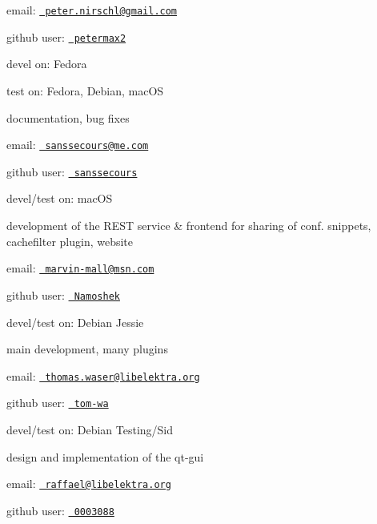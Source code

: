 \begin{DoxyItemize}
\item email\+: \href{mailto:peter.nirschl@gmail.com}{\texttt{ peter.\+nirschl@gmail.\+com}}
\item github user\+: \href{http://github.com/petermax2}{\texttt{ petermax2}}
\item devel on\+: Fedora
\item test on\+: Fedora, Debian, mac\+OS
\end{DoxyItemize}

documentation, bug fixes


\begin{DoxyItemize}
\item email\+: \href{mailto:sanssecours@me.com}{\texttt{ sanssecours@me.\+com}}
\item github user\+: \href{http://github.com/sanssecours}{\texttt{ sanssecours}}
\item devel/test on\+: mac\+OS
\end{DoxyItemize}

development of the R\+E\+ST service \& frontend for sharing of conf. snippets, cachefilter plugin, website


\begin{DoxyItemize}
\item email\+: \href{mailto:marvin-mall@msn.com}{\texttt{ marvin-\/mall@msn.\+com}}
\item github user\+: \href{https://github.com/Namoshek}{\texttt{ Namoshek}}
\item devel/test on\+: Debian Jessie
\end{DoxyItemize}

main development, many plugins


\begin{DoxyItemize}
\item email\+: \href{mailto:thomas.waser@libelektra.org}{\texttt{ thomas.\+waser@libelektra.\+org}}
\item github user\+: \href{https://github.com/tom-wa}{\texttt{ tom-\/wa}}
\item devel/test on\+: Debian Testing/\+Sid
\end{DoxyItemize}

design and implementation of the qt-\/gui


\begin{DoxyItemize}
\item email\+: \href{mailto:raffael@libelektra.org}{\texttt{ raffael@libelektra.\+org}}
\item github user\+: \href{https://github.com/0003088}{\texttt{ 0003088}}
\end{DoxyItemize}

